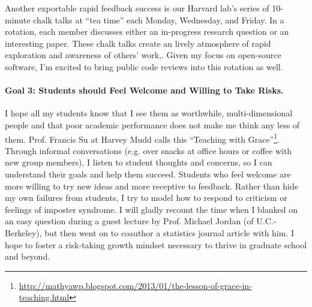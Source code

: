 \documentclass[11pt,letterpaper]{article}
\begin{document}

Another exportable rapid feedback success is our Harvard lab's series of 10-minute chalk talks at ``tea time'' each Monday, Wednesday, and Friday. In a rotation, each member discusses either an in-progress research question or an interesting paper. 
These chalk talks create an lively atmosphere of rapid exploration and awareness of others' work,. Given my focus on open-source software, I'm excited to bring public code reviews into this rotation as well. 

\paragraph{Goal 3: Students should Feel Welcome and Willing to Take Risks.}
I hope all my students know that I see them as worthwhile, multi-dimensional people and that poor academic performance does not make me think any less of them.
Prof. Francis Su at Harvey Mudd calls this ``Teaching with Grace''\footnote{\url{http://mathyawp.blogspot.com/2013/01/the-lesson-of-grace-in-teaching.html}}. 
Through informal conversations (e.g. over snacks at office hours or coffee with new group members), I listen to student thoughts and concerns, so I can understand their goals and help them succeed.
Students who feel welcome are more willing to try new ideas and more receptive to feedback.
Rather than hide my own failures from students, I try to 
model how to respond to criticism or feelings of imposter syndrome. I will gladly recount the time when I blanked on an easy question during a guest lecture by Prof. Michael Jordan (of U.C.-Berkeley), but then went on to coauthor a statistics journal article with him.
I hope to foster a risk-taking growth mindset necessary to thrive in graduate school and beyond.
\end{document}
